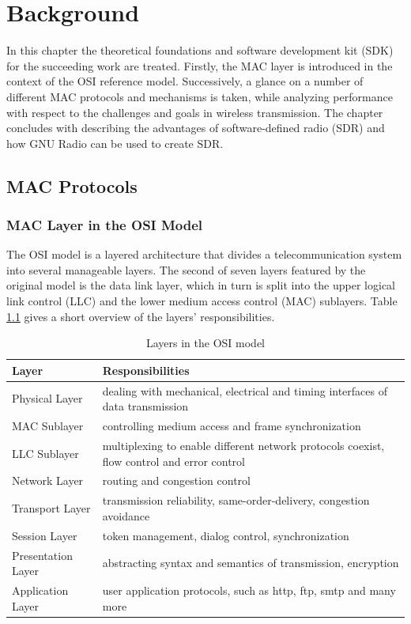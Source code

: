 \chapter{Background}

In this chapter the theoretical foundations and software development kit (SDK) for the succeeding work are treated. Firstly, the MAC layer is introduced in the context of the OSI reference model. Successively, a glance on a number of different MAC protocols and mechanisms is taken, while analyzing performance with respect to the challenges and goals in wireless transmission. The chapter concludes with describing the advantages of software-defined radio (SDR) and how GNU Radio can be used to create SDR.

\section{MAC Protocols}

\subsection{MAC Layer in the OSI Model}

The OSI model is a layered architecture that divides a telecommunication system into several manageable layers. The second of seven layers featured by the original model is the data link layer, which in turn is split into the upper logical link control (LLC) and the lower medium access control (MAC) sublayers. Table \ref{tab:osi-layers} gives a short overview of the layers' responsibilities. 

\begin{table}[b]
	\centering
	\begin{center}
		\begin{tabular}{p{3.5cm}p{10cm}}
			\toprule
				Layer & Responsibilities \\
			\midrule
				Physical Layer & dealing with mechanical, electrical and timing interfaces of data transmission  \\
				MAC Sublayer & controlling medium access and frame synchronization \\
				LLC Sublayer & multiplexing to enable different network protocols coexist, flow control and error control \\
				Network Layer & routing and congestion control \\
				Transport Layer & transmission reliability, same-order-delivery, congestion avoidance  \\
				Session Layer & token management, dialog control, synchronization \\
				Presentation Layer & abstracting syntax and semantics of transmission, encryption \\
				Application Layer & user application protocols, such as http, ftp, smtp and many more \\
			\bottomrule
		\end{tabular}\caption{Layers in the OSI model} \label{tab:osi-layers}
	\end{center}
\end{table}

